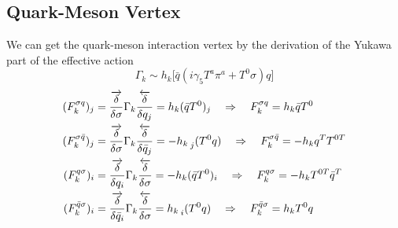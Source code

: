 \documentclass[UTF8]{article}
\begin{document}
\subsection{Quark-Meson Vertex}
We can get the quark-meson interaction vertex by the derivation of the Yukawa part of the effective action
\begin{equation}
\Gamma_k\sim h_k\big[ \bar{q}(i\gamma_5 T^a \pi^a +T^0\sigma)q \big]
\end{equation}
\begin{equation}
\begin{split}
(F^{\sigma q}_k)_j&=\frac{\overrightarrow{\delta}}{\delta\sigma}\Gamma_k\frac{\overleftarrow{\delta}}{\delta q_j}=h_k(\bar{q}T^0)_j\quad\Rightarrow\quad F^{\sigma q}_k=h_k \bar{q}T^0\\
(F^{\sigma \bar{q}}_k)_j&=\frac{\overrightarrow{\delta}}{\delta\sigma}\Gamma_k\frac{\overleftarrow{\delta}}{\delta \bar{q}_j}=-h_k\prescript{}{j}{(T^0 q)}\quad\Rightarrow\quad F^{\sigma \bar{q}}_k=-h_k q^TT^{0T}\\
(F^{q\sigma}_k)_i&=\frac{\overrightarrow{\delta}}{\delta q_i}\Gamma_k\frac{\overleftarrow{\delta}}{\delta \sigma}=-h_k(\bar{q}T^0)_i\quad\Rightarrow\quad F^{q\sigma}_k=-h_k T^{0T}\bar{q}^T\\
(F^{\bar{q}\sigma}_k)_i&=\frac{\overrightarrow{\delta}}{\delta\bar{q}_i}\Gamma_k\frac{\overleftarrow{\delta}}{\delta\sigma}=h_k\prescript{}{i}{(T^0 q)}\quad\Rightarrow\quad F^{\bar{q}\sigma}_k=h_k T^0 q\\
\end{split}
\end{equation}
\end{document}
